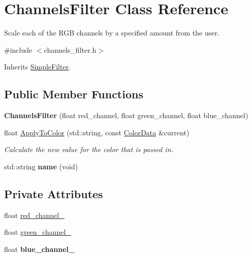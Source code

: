 \hypertarget{classChannelsFilter}{}\section{Channels\+Filter Class Reference}
\label{classChannelsFilter}


Scale each of the R\+GB channels by a specified amount from the user.  




{\ttfamily \#include $<$channels\+\_\+filter.\+h$>$}



Inherits \hyperlink{classSimpleFilter}{Simple\+Filter}.

\subsection*{Public Member Functions}
\begin{DoxyCompactItemize}
\item 
{\bfseries Channels\+Filter} (float red\+\_\+channel, float green\+\_\+channel, float blue\+\_\+channel)\hypertarget{classChannelsFilter_a7385bf66016c0525eb3b60707d0736fd}{}\label{classChannelsFilter_a7385bf66016c0525eb3b60707d0736fd}

\item 
float \hyperlink{classChannelsFilter_a0eec6a503fa03e7ef9f0efc00ad0761c}{Apply\+To\+Color} (std\+::string, const \hyperlink{classimage__tools_1_1ColorData}{Color\+Data} \&current)
\begin{DoxyCompactList}\small\item\em Calculate the new value for the color that is passed in. \end{DoxyCompactList}\item 
std\+::string {\bfseries name} (void)\hypertarget{classChannelsFilter_acb94fe6537229551399ea4fccdc0fd1b}{}\label{classChannelsFilter_acb94fe6537229551399ea4fccdc0fd1b}

\end{DoxyCompactItemize}
\subsection*{Private Attributes}
\begin{DoxyCompactItemize}
\item 
float \hyperlink{classChannelsFilter_ab844b335f0260f3b55b45be29da207a6}{red\+\_\+channel\+\_\+}
\item 
float \hyperlink{classChannelsFilter_adf3f927d85cd418b0e2d254e20c88381}{green\+\_\+channel\+\_\+}
\item 
float {\bfseries blue\+\_\+channel\+\_\+}\hypertarget{classChannelsFilter_a5ea1d1f6665c961c6ceb4bcc08b5dfc6}{}\label{classChannelsFilter_a5ea1d1f6665c961c6ceb4bcc08b5dfc6}

\end{DoxyCompactItemize}


